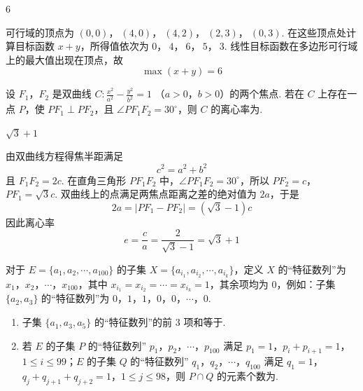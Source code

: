\begin{answer}
6
\end{answer}

\begin{solution}
可行域的顶点为
\((0,0)\)，\(\ (4,0)\)，\(\ (4,2)\)，\(\ (2,3)\)，\(\ (0,3)\).
在这些顶点处计算目标函数 \(x+y\)，所得值依次为
\(0\)，\(\ 4\)，\(\ 6\)，\(\ 5\)，\(\ 3\).
线性目标函数在多边形可行域上的最大值出现在顶点，故
\[
\max(x+y)=6
\]
\end{solution}

\begin{problem}
设 \(F_{1}\)，\(F_{2}\) 是双曲线 \(C: \frac{x^{2}}{a^{2}} - \frac{y^{2}}{b^{2}} = 1 \) （\(a > 0\)，\(b > 0\)）的两个焦点. 若在 \(C\) 上存在一点 \(P\)，使 \(PF_{1} \perp PF_{2}\)，且 \(\angle PF_{1}F_{2} = 30^{\circ}\)，则 \(C\) 的离心率为\fillinblank{}.
\end{problem}

\begin{answer}
\(\sqrt{3}+1\)
\end{answer}

\begin{solution}
由双曲线方程得焦半距满足
\[
c^2=a^2+b^2
\]
且 \(F_1F_2=2c\). 在直角三角形 \(PF_1F_2\) 中，\(\angle PF_1F_2=30^\circ\)，所以
\(PF_2=c\)，\(PF_1=\sqrt3c\).
双曲线上的点满足两焦点距离之差的绝对值为 \(2a\)，于是
\[
2a=\left|PF_1-PF_2\right|=(\sqrt3-1)c
\]
因此离心率
\[
e=\frac ca=\frac{2}{\sqrt3-1}=\sqrt3+1
\]
\end{solution}

\begin{problem}
对于 \(E = \{a_1, a_2, \cdots, a_{100}\}\) 的子集 \(X = \{a_{i_1}, a_{i_2}, \cdots, a_{i_k}\}\)，定义 \(X\) 的“特征数列”为 \(x_1\)，\(x_2\)，\(\cdots\)，\(x_{100}\)，其中 \(x_{i_1} = x_{i_2} = \cdots = x_{i_k} = 1\)，其余项均为 \(0\)，例如：子集 \(\{a_2, a_3\}\) 的“特征数列”为 \(0\)，\(1\)，\(1\)，\(0\)，\(0\)，\(\cdots\)，\(0\).
\begin{enumerate}
\item 子集 \( \{a_{1}, a_{3}, a_{5}\} \) 的“特征数列”的前 3 项和等于\fillinblank{}.
\item 若 \(E\) 的子集 \(P\) 的“特征数列” \(p_{1}\)，\(p_{2}\)，\(\cdots\)，\(p_{100}\) 满足 \(p_{1}=1\)，\(p_{i}+p_{i+1}=1\)，\(1\leqslant i\leqslant99\)；\(E\) 的子集 \(Q\) 的“特征数列” \(q_{1}\)，\(q_{2}\)，\(\cdots\)，\(q_{100}\) 满足 \(q_{1}=1\)，\(q_{j}+q_{j+1}+q_{j+2}=1\)，\(1\leqslant j\leqslant98\)，则 \(P\cap Q\) 的元素个数为\fillinblank{}.
\end{enumerate}
\end{problem}

